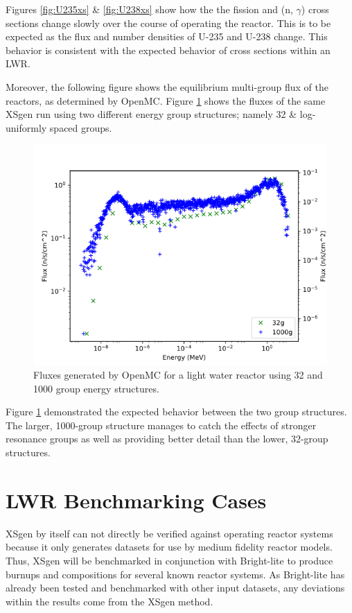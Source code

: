 \documentclass{article}
\begin{document}
Figures \ref{fig:U235xs} \& \ref{fig:U238xs} show how the the fission and (n, $\gamma$)
cross sections change slowly over the course of operating the reactor. This is to be
expected as the flux and number densities of U-235 and U-238 change. 
This behavior is consistent with the expected behavior of cross sections within an LWR.

Moreover, the following figure shows the equilibrium multi-group flux of the reactors, as
determined by OpenMC.
Figure \ref{fig:32g} shows the fluxes of the same XSgen run using two different energy group
structures; namely 32 \& log-uniformly spaced groups.
\begin{figure}[h]
  \center
  \includegraphics[scale=0.7]{fluxes.png}
  \caption{Fluxes generated by OpenMC for a light water reactor using 32 and 1000 group energy structures.}
  \label{fig:32g}
\end{figure}
Figure \ref{fig:32g} demonstrated the expected behavior between the two group structures.
The larger, 1000-group structure manages to catch the effects of stronger resonance groups
as well as providing better detail than the lower, 32-group structures.

\section{LWR Benchmarking Cases}
XSgen by itself can not directly be verified against operating reactor systems because it
only generates datasets for use by medium fidelity reactor models.
Thus, XSgen will be benchmarked in conjunction with Bright-lite to produce burnups and
compositions for several known reactor systems. As Bright-lite has already been tested
and benchmarked with other input datasets\cite{brightlite},
any deviations within the results come from the XSgen method.
\end{document}
